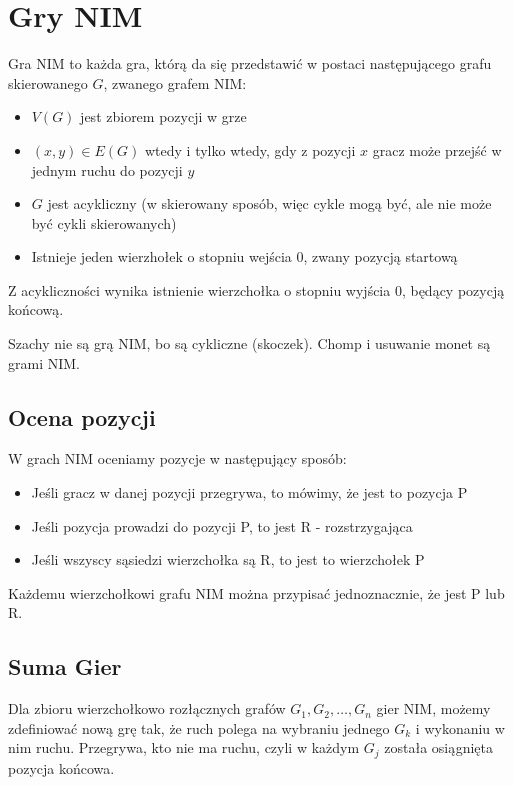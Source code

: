 \documentclass{../notatki}
\begin{document}
\section{Gry NIM}

Gra NIM to każda gra, którą da się przedstawić w postaci następującego
grafu skierowanego $G$, zwanego grafem NIM:
\begin{itemize}
  \item $V(G)$ jest zbiorem pozycji w grze
  \item $(x, y) \in E(G)$ wtedy i tylko wtedy, gdy z pozycji $x$ gracz może
    przejść w jednym ruchu do pozycji $y$
  \item $G$ jest acykliczny (w skierowany sposób, więc cykle mogą
    być, ale nie może być cykli skierowanych)
  \item Istnieje jeden wierzhołek o stopniu wejścia 0, zwany pozycją startową
\end{itemize}
Z acykliczności wynika istnienie wierzchołka o stopniu wyjścia 0, będący pozycją
końcową.

\begin{examplebox}
  Szachy nie są grą NIM, bo są cykliczne (skoczek). Chomp i usuwanie
  monet są grami NIM.
\end{examplebox}

\subsection{Ocena pozycji}

W grach NIM oceniamy pozycje w następujący sposób:
\begin{itemize}
  \item Jeśli gracz w danej pozycji przegrywa, to mówimy, że jest to pozycja P
  \item Jeśli pozycja prowadzi do pozycji P, to jest R - rozstrzygająca
  \item Jeśli wszyscy sąsiedzi wierzchołka są R, to jest to wierzchołek P
\end{itemize}

Każdemu wierzchołkowi grafu NIM można przypisać jednoznacznie, że jest P lub R.

\subsection{Suma Gier}

Dla zbioru wierzchołkowo rozłącznych grafów $G_1, G_2, \dots, G_n$ gier NIM,
możemy zdefiniować nową grę tak, że ruch polega na wybraniu jednego $G_k$ i
wykonaniu w nim ruchu. Przegrywa, kto nie ma ruchu, czyli w każdym $G_j$ została
osiągnięta pozycja końcowa.
\end{document}
